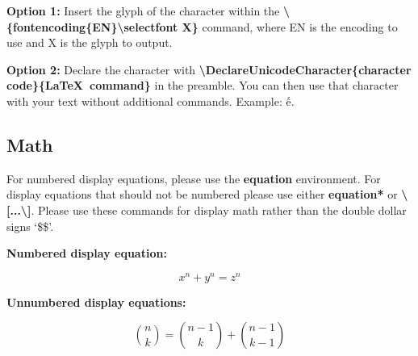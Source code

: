 \documentclass[hasAbstract,authorBox]{csmagazine}
\begin{document}
\textbf{Option 1:} Insert the glyph of the character within the \textbf{\textbackslash{}\{fontencoding\{EN\}\textbackslash{}selectfont X\}} command, where EN is the encoding to use and X is the glyph to output.


\textbf{Option 2:} Declare the character with \textbf{\textbackslash{}DeclareUnicodeCharacter\{character code\}\{\LaTeX\ command\}} in the preamble. You can then use that character with your text without additional commands. Example: ế.




\subsection{Math}

For numbered display equations, please use the \textbf{equation} environment. For display equations that should not be numbered please use either \textbf{equation*}  or \textbf{\textbackslash[...\textbackslash]}. Please use these commands for display math rather than the double dollar signs `\$\$'.

\textbf{Numbered display equation:}

\begin{equation}
x^n + y^n = z^n
\end{equation}

\textbf{Unnumbered display equations:}

\[\binom{n}{k} =\binom{n-1}{k} + \binom{n-1}{k-1}\]
\end{document}
